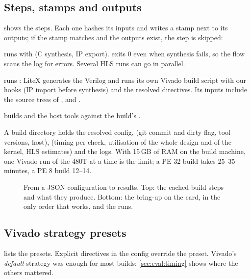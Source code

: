 \subsection{Steps, stamps and outputs}
 shows the steps. Each one hashes its inputs and writes a stamp next to its outputs; if the stamp
matches and the outputs exist, the step is skipped:
\begin{description}[font=\sffamily\small\bfseries, leftmargin=1.2em]
  \item[\code{HlsStep}] runs  with  (C synthesis, IP export).
         exits 0 even when synthesis fails, so the flow scans the log for errors. Several HLS runs
        can go in parallel.
  \item[\code{SocStep}] runs : LiteX generates the Verilog and runs its own Vivado build
        script with our hooks (IP import before synthesis) and the resolved directives. Its inputs include the source
        trees of ,  and .
  \item[\code{HostStep}] builds  and the host tools against the build's .
\end{description}
A build directory holds the resolved config,  (git commit and dirty flag, tool versions, host),
 (timing per check, utilisation of the whole design and of the kernel, HLS estimates) and
the logs. With 15\,GB of RAM on the build machine, one Vivado run of the 480T at a time is the limit; a PE 32 build
takes 25--35 minutes, a PE 8 build 12--14.

\begin{figure}[t]
  \centering
  \resizebox{\linewidth}{!}{}
  \caption{From a JSON configuration to results. Top: the cached build steps and what they produce. Bottom: the
    bring-up on the card, in the only order that works, and the runs.}
  \label{fig:flow}
\end{figure}

\subsection{Vivado strategy presets}
 lists the presets. Explicit directives in the config override the preset. Vivado's \emph{default}
strategy was enough for most builds; \cref{sec:eval:timing} shows where the others mattered.


